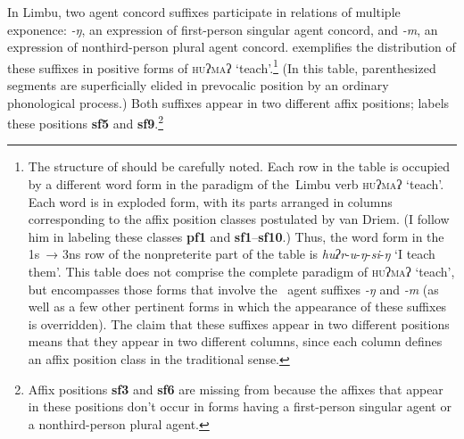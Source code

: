 \documentclass[output=paper,
modfonts
]{LSP/langsci}
\begin{document}
In Limbu, two agent concord suffixes participate in relations of multiple exponence:  \textit{\nobreakdash-ŋ}, an expression of first\nobreakdash-person singular agent concord, and \textit{\nobreakdash-m}, an expression of nonthird\nobreakdash-person plural agent concord.  exemplifies the distribution of these suffixes in positive forms of \textsc{huʔmaʔ} ‘teach’.\footnote{The structure of  should be carefully noted. Each row in the table is occupied by a different word form in the paradigm of the~Limbu verb \textsc{huʔmaʔ} ‘teach’. Each word is in exploded form, with its parts arranged in columns corresponding to the affix position classes postulated by van Driem. (I follow him in labeling these classes \textbf{pf1} and \textbf{sf1}–\textbf{sf10}.) Thus, the word form in the 1s~→ 3ns row of the nonpreterite part of the table is \textit{huʔr}{}-\textit{u}{}-\textit{ŋ}{}-\textit{si}{}-\textit{ŋ} ‘I teach them’. This table does not comprise the complete paradigm of \textsc{huʔmaʔ} ‘teach’, but encompasses those forms that involve the~ agent suffixes \textit{{}-ŋ} and \textit{{}-m} (as well as a few other pertinent forms in which the appearance of these suffixes is overridden). The claim that these suffixes appear in two different positions means that they appear in two different columns, since each column defines an affix position class in the traditional sense.}   (In this table, parenthesized segments are superficially elided in prevocalic position by an ordinary phonological process.)  Both suffixes appear in two different affix positions;  \citet{Driem1987} labels these positions \textbf{sf5} and \textbf{sf9}.\footnote{Affix positions \textbf{sf3} and \textbf{sf6} are missing from  because the affixes that appear in these positions don’t occur in forms having a first\nobreakdash-person singular agent or a nonthird\nobreakdash-person plural agent.}
\end{document}
